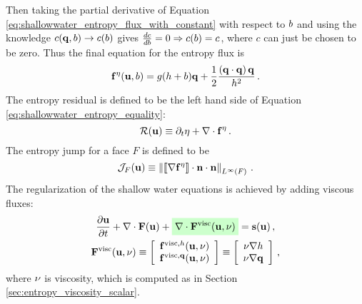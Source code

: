 Then taking the partial derivative of Equation
\eqref{eq:shallowwater_entropy_flux_with_constant} with respect to $b$
and using the knowledge $c(\mathbf{q},b)\rightarrow c(b)$
gives $\frac{d c}{d b}=0\Rightarrow c(b)=c$, where
$c$ can just be chosen to be zero. Thus the final equation for the
entropy flux is
\begin{equation}
  \mathbf{f}^\eta(\mathbf{u},b)
  = g(h + b)\mathbf{q}
  + \frac{1}{2}\frac{\left(\mathbf{q}\cdot\mathbf{q}\right)\mathbf{q}} 
  {h^2}
  \,.
\end{equation}
The entropy residual is defined to be the left hand side of 
Equation \eqref{eq:shallowwater_entropy_equality}:
\begin{equation}
  \mathcal{R}(\mathbf{u}) \equiv \partial_t\eta
  + \nabla\cdot\mathbf{f}^\eta
  \,.
\end{equation}
The entropy jump for a face $F$ is defined to be
\begin{equation}
  \mathcal{J}_F(\mathbf{u})
  \equiv \left\|
    \left\llbracket\nabla\mathbf{f}^\eta\right\rrbracket
    \cdot\mathbf{n}\cdot\mathbf{n}
  \right\|_{L^\infty(F)} \,.
\end{equation}
The regularization of the shallow water equations is achieved by adding
viscous fluxes:
\begin{equation}
\begin{gathered}
  \ppt{\vectorsolution} + \nabla\cdot\consfluxvector
  + \highlightgreen{\nabla\cdot\viscconsfluxvector}
  = \conssource \eqc
\\
  \viscconsfluxvector
  \equiv \left[\begin{array}{c}
    \viscflux{\height}(\vectorsolution,\viscosity)\\
    \viscflux{\heightmomentum}(\vectorsolution,\viscosity)
    \end{array}\right]
  \equiv \left[\begin{array}{c}
    \viscosity\nabla\height\\
    \viscosity\nabla\heightmomentum
    \end{array}\right] \eqc
\end{gathered}
\end{equation}
where $\nu$ is viscosity, which is computed as in Section
\ref{sec:entropy_viscosity_scalar}.
